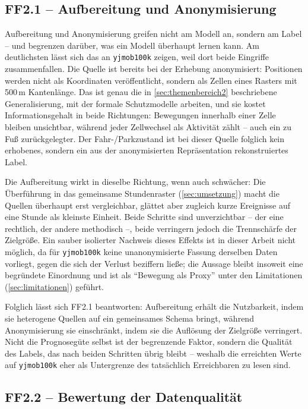 \subsection{FF2.1 -- Aufbereitung und Anonymisierung}

Aufbereitung und Anonymisierung greifen nicht am Modell an, sondern am Label -- und begrenzen darüber, was ein Modell überhaupt lernen kann. Am deutlichsten lässt sich das an \texttt{yjmob100k} zeigen, weil dort beide Eingriffe zusammenfallen. Die Quelle ist bereits bei der Erhebung anonymisiert: Positionen werden nicht als Koordinaten veröffentlicht, sondern als Zellen eines Rasters mit 500\,m Kantenlänge. Das ist genau die in \cref{sec:themenbereich2} beschriebene Generalisierung, mit der formale Schutzmodelle arbeiten, und sie kostet Informationsgehalt in beide Richtungen: Bewegungen innerhalb einer Zelle bleiben unsichtbar, während jeder Zellwechsel als Aktivität zählt -- auch ein zu Fuß zurückgelegter. Der Fahr-/Parkzustand ist bei dieser Quelle folglich kein erhobenes, sondern ein aus der anonymisierten Repräsentation rekonstruiertes Label.

Die Aufbereitung wirkt in dieselbe Richtung, wenn auch schwächer: Die Überführung in das gemeinsame Stundenraster (\cref{sec:umsetzung}) macht die Quellen überhaupt erst vergleichbar, glättet aber zugleich kurze Ereignisse auf eine Stunde als kleinste Einheit. Beide Schritte sind unverzichtbar -- der eine rechtlich, der andere methodisch --, beide verringern jedoch die Trennschärfe der Zielgröße. Ein sauber isolierter Nachweis dieses Effekts ist in dieser Arbeit nicht möglich, da für \texttt{yjmob100k} keine unanonymisierte Fassung derselben Daten vorliegt, gegen die sich der Verlust beziffern ließe; die Aussage bleibt insoweit eine begründete Einordnung und ist als \enquote{Bewegung als Proxy} unter den Limitationen (\cref{sec:limitationen}) geführt.

Folglich lässt sich FF2.1 beantworten: Aufbereitung erhält die Nutzbarkeit, indem sie heterogene Quellen auf ein gemeinsames Schema bringt, während Anonymisierung sie einschränkt, indem sie die Auflösung der Zielgröße verringert. Nicht die Prognosegüte selbst ist der begrenzende Faktor, sondern die Qualität des Labels, das nach beiden Schritten übrig bleibt -- weshalb die erreichten Werte auf \texttt{yjmob100k} eher als Untergrenze des tatsächlich Erreichbaren zu lesen sind.

\subsection{FF2.2 -- Bewertung der Datenqualität}

